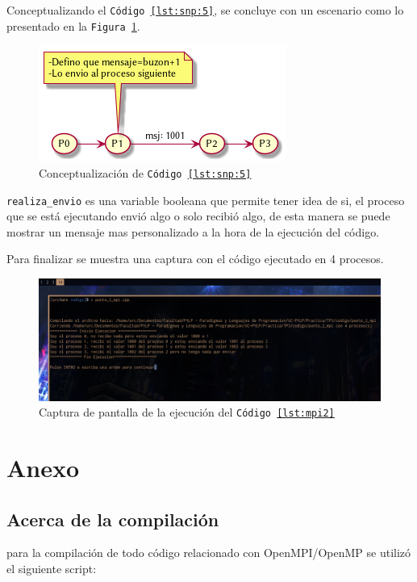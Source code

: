 \documentclass{article}
\begin{document}
Conceptualizando el \texttt{C\'odigo \ref{lst:snp:5}}, se concluye con un
escenario como lo presentado en la \texttt{Figura \ref{fig:conej2_3}}.

\begin{figure}[H]
  \centering
  \includegraphics[width=.4\linewidth]{EJ2_003}
  \caption{Conceptualizaci\'on de \texttt{C\'odigo \ref{lst:snp:5}}}
  \label{fig:conej2_3}
\end{figure}

\texttt{realiza\_envio} es una variable booleana que permite tener idea de si,
el proceso que se est\'a ejecutando envi\'o algo o solo recibi\'o algo, de esta
manera se puede mostrar un mensaje mas personalizado a la hora de la
ejecuci\'on del c\'odigo.

Para finalizar se muestra una captura con el c\'odigo ejecutado en 4 procesos.

\begin{figure}[H]
  \centering
  \includegraphics[width=.95\linewidth]{EJ2_Captura}
  \caption{Captura de pantalla de la ejecuci\'on del \texttt{C\'odigo \ref{lst:mpi2}}}
  \label{fig:ej2_captura}
\end{figure}



\newpage
\section{Anexo}
\subsection{Acerca de la compilaci\'on}
\label{an:compilacion}
para la compilación de todo código relacionado con OpenMPI/OpenMP se utilizó el
siguiente script:
\end{document}
